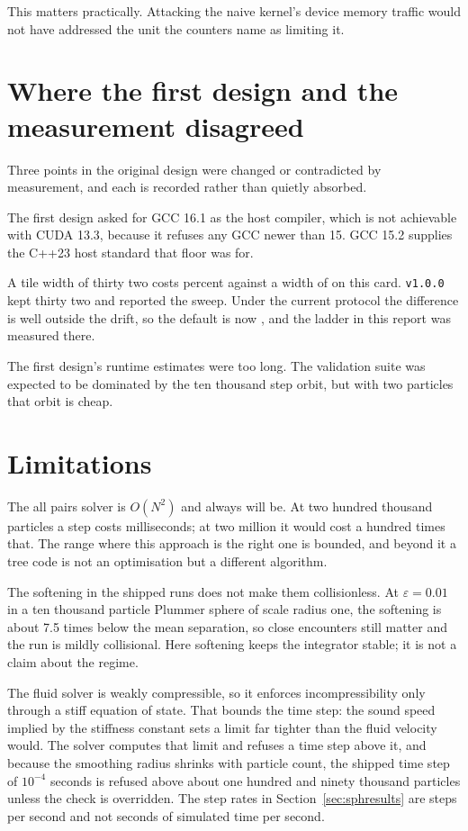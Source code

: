 This matters practically. Attacking the naive kernel's device memory traffic would not
have addressed the unit the counters name as limiting it.

\section{Where the first design and the measurement disagreed}

Three points in the original design were changed or contradicted by
measurement, and each is recorded rather than quietly absorbed.

The first design asked for GCC 16.1 as the host compiler, which is not achievable with CUDA
13.3, because it refuses any GCC newer than 15. GCC 15.2 supplies the C++23 host standard
that floor was for.

A tile width of thirty two costs \TileWidthGainPercent{} percent against a width of
\BestTileWidth{} on this card. \texttt{v1.0.0} kept thirty two and reported the sweep.
Under the current protocol the difference is well outside the drift, so the default is now
\BestTileWidth{}, and the ladder in this report was measured there.

The first design's runtime estimates were too long. The validation suite was expected to
be dominated by the ten thousand step orbit, but with two particles that orbit is cheap.

\section{Limitations}

The all pairs solver is $O(N^2)$ and always will be. At two hundred thousand
particles a step costs \TiledMsAtMaxN{} milliseconds; at two million it would
cost a hundred times that. The range where this approach is the right one is
bounded, and beyond it a tree code is not an optimisation but a different
algorithm.

The softening in the shipped runs does not make them collisionless. At $\varepsilon =
0.01$ in a ten thousand particle Plummer sphere of scale radius one, the softening is about
7.5 times below the mean separation, so close encounters still matter and the run is mildly
collisional. Here softening keeps the integrator stable; it is not a claim about the regime.

The fluid solver is weakly compressible, so it enforces incompressibility only
through a stiff equation of state. That bounds the time step: the sound speed
implied by the stiffness constant sets a limit far tighter than the fluid velocity would.
The solver computes that limit and refuses a time step above it, and because the smoothing
radius shrinks with particle count, the shipped time step of $10^{-4}$ seconds is refused
above about one hundred and ninety thousand particles unless the check is overridden. The
step rates in Section~\ref{sec:sphresults} are steps per second and not seconds of
simulated time per second.

